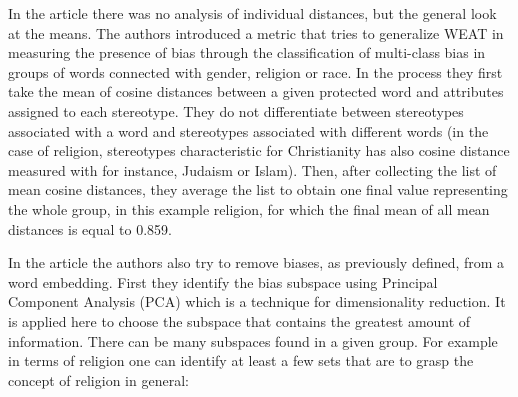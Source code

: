 \documentclass[
  12pt,
]{book}
\begin{document}
\begin{table}

\caption{\label{tab:religionTableHeadEarly}Head of the religion dataset.}
\centering
{}
\end{table}
\normalsize

\pagebreak

In the article there was no analysis of individual distances, but the general look at the means. The authors introduced a metric that tries to generalize WEAT in measuring the presence of bias through the classification of multi-class bias in groups of words connected with gender, religion or race. In the process they first take the mean of cosine distances between a given protected word and attributes assigned to each stereotype. They do not differentiate between stereotypes associated with a word and stereotypes associated with different words (in the case of religion, stereotypes characteristic for Christianity has also cosine distance measured with for instance, Judaism or Islam). Then, after collecting the list of mean cosine distances, they average the list to obtain one final value representing the whole group, in this example religion, for which the final mean of all mean distances is equal to 0.859.

In the article the authors also try to remove biases, as previously defined, from a word embedding. First they identify the bias subspace using Principal Component Analysis (PCA) which is a technique for dimensionality reduction. It is applied here to choose the subspace that contains the greatest amount of information. There can be many subspaces found in a given group. For example in terms of religion one can identify at least a few sets that are to grasp the concept of religion in general:
\end{document}
